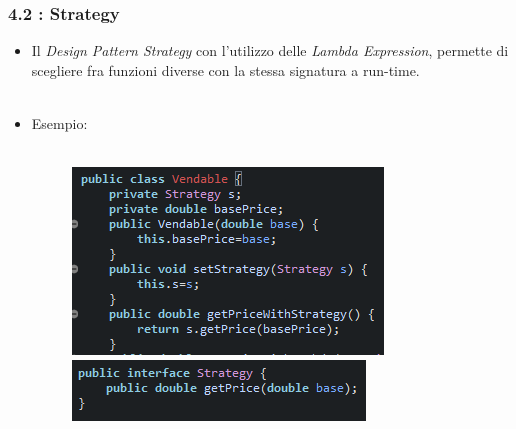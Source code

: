 \documentclass{beamer}
\begin{document}
\begin{frame}
	\frametitle{\textbf{4.2 : Strategy}}
	\begin{itemize}
		\item
			Il \textit{Design Pattern Strategy} con l'utilizzo delle \textit{Lambda Expression}, permette di scegliere fra funzioni diverse con la stessa signatura a run-time.\\\
		\item
			Esempio:\\\
			\begin{figure}
				\centering
				\includegraphics[width=0.5\linewidth]{image/strategy.png}
				\label{fig:target}
				\centering
				\includegraphics[width=0.4\linewidth]{image/interfaceStrategy.png}
				\label{fig:target}
			\end{figure}		
	\end{itemize}
\end{frame}

\end{document}
